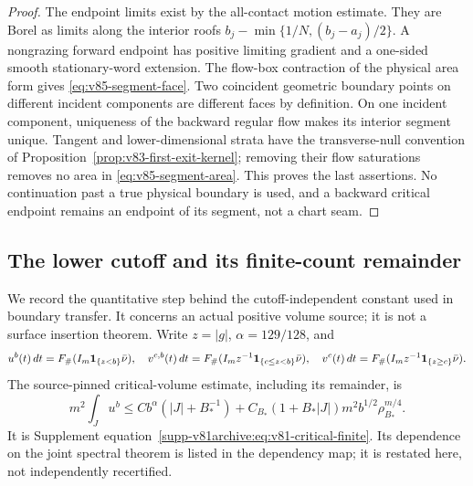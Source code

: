 \begin{proof}
The endpoint limits exist by the all-contact motion estimate. They are
Borel as limits along the interior roofs
$b_j-\min\{1/N,(b_j-a_j)/2\}$. A nongrazing forward endpoint has
positive limiting gradient and a one-sided smooth stationary-word
extension. The flow-box contraction of the physical area form gives
\eqref{eq:v85-segment-face}. Two coincident geometric boundary points
on different incident components are different faces by definition.
On one incident component, uniqueness of the backward regular flow
makes its interior segment unique. Tangent and lower-dimensional
strata have the transverse-null convention of
Proposition~\ref{prop:v83-first-exit-kernel}; removing their flow
saturations removes no area in \eqref{eq:v85-segment-area}. This proves
the last assertions. No continuation past a true physical boundary is
used, and a backward critical endpoint remains an endpoint of its
segment, not a chart seam.
\end{proof}

\subsection{The lower cutoff and its finite-count remainder}
We record the quantitative step behind the cutoff-independent constant
used in boundary transfer. It concerns an actual positive volume source;
it is not a surface insertion theorem. Write $z=|g|$, $\alpha=129/128$,
and
\[
 u^b(t)\,dt=F_\#(I_m\mathbf1_{\{z<b\}}\bar\nu),\quad
 v^{c,b}(t)\,dt=F_\#(I_mz^{-1}\mathbf1_{\{c\le z<b\}}\bar\nu),\quad
 v^c(t)\,dt=F_\#(I_mz^{-1}\mathbf1_{\{z\ge c\}}\bar\nu).
\]
The source-pinned critical-volume estimate, including its remainder, is
\begin{equation}\label{eq:v85-critical-input}
 m^2\int_Ju^b\le Cb^\alpha(|J|+B_*^{-1})
 +C_{B_*}(1+B_*|J|)m^2b^{1/2}\rho_{B_*}^{m/4}.
\end{equation}
It is Supplement equation~\eqref{supp-v81archive:eq:v81-critical-finite}.
Its dependence on the joint spectral theorem is listed in the dependency
map; it is restated here, not independently recertified.

